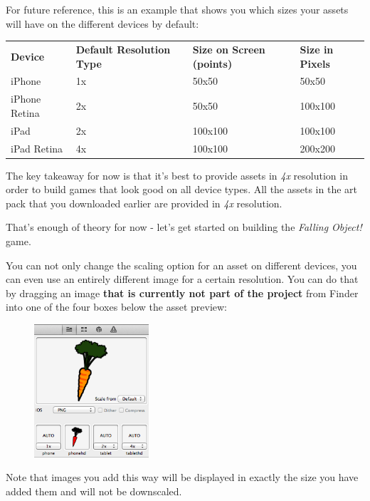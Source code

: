 For future reference, this is an example that shows you which sizes your assets
will have on the different devices by default:

\begin{table}[H]
\begin{tabular}{llll}
\textbf{Device} & \textbf{Default Resolution Type} & \textbf{Size on Screen (points)} & \textbf{Size in Pixels} \\
iPhone          & 1x                               & 50x50                            & 50x50                   \\
iPhone Retina   & 2x                               & 50x50                            & 100x100                 \\
iPad            & 2x                               & 100x100                          & 100x100                 \\
iPad Retina     & 4x                               & 100x100                          & 200x200                
\end{tabular}
\end{table}

The key takeaway for now is that it's best to provide assets in \textit{4x}
resolution in order to build games that look good on all device types. All the
assets in the art pack that you downloaded earlier are provided in \textit{4x}
resolution.

That's enough of theory for now - let's get started on building the
\textit{Falling Object!} game.

\begin{details} 
You can not only change the scaling option for an asset on different devices,
you can even use an entirely different image for a certain resolution. You can
do that by dragging an image \textbf{that is currently not part of the \SB{}
project} from Finder into one of the four boxes below the asset preview:
\begin{figure}[H]
		\centering
		\includegraphics[height=140pt]{images/Chapter2/DifferentImageDevice.png}
\end{figure}

Note that images you add this way will be displayed in exactly the size you have
added them and will not be downscaled.

\end{details}

